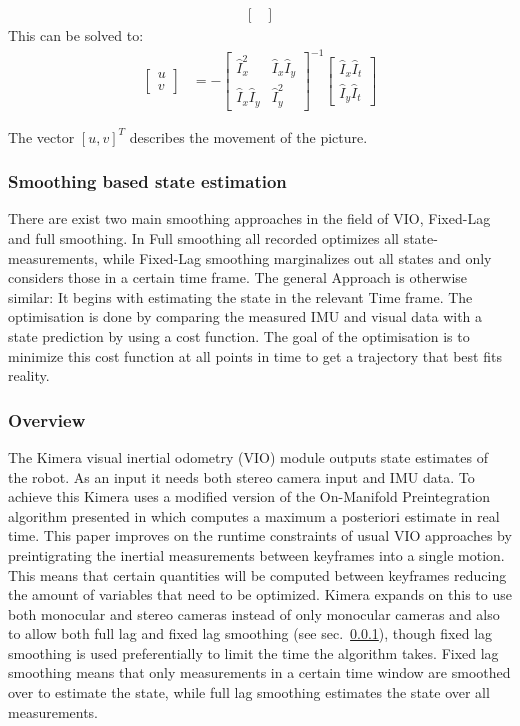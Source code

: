 \documentclass[11pt,a4paper]{article}
\begin{document}
\begin{enumerate}
\begin{align*}
\begin{bmatrix}
           \end{bmatrix}
        \end{align*}
        This can be solved to: 
        \begin{align*}
           \begin{bmatrix}
                u \\ v 
           \end{bmatrix}
           &= - 
           \begin{bmatrix}
               \hat I_x^2 & \hat I_x \hat I_y \\  \hat I_x \hat I_y & \hat I_y^2
           \end{bmatrix} ^{-1}
           \begin{bmatrix}
                \hat I_x \hat I_t \\ \hat I_y \hat I_t 
           \end{bmatrix}
        \end{align*}
\end{enumerate}
The vector $[u,v]^T$ describes the movement of the picture.
\subsubsection{Smoothing based state estimation} \label{Pre:Smoothing}
There are exist two main smoothing approaches in the field of VIO, Fixed-Lag and full smoothing.
In Full smoothing all recorded optimizes all state-measurements, while Fixed-Lag smoothing marginalizes out all states and only considers those in a certain time frame.
The general Approach is otherwise similar: It begins with estimating the state in the relevant Time frame.
The optimisation is done by comparing the measured IMU and visual data with a state prediction by using a cost function. 
The goal of the optimisation is to minimize this cost function at all points in time to get a trajectory that best fits reality.
\subsubsection{Overview} \label{Sec:K-VIO overview}
The Kimera visual inertial odometry (VIO) module outputs state estimates of the robot.
As an input it needs both stereo camera input and IMU data. 
To achieve this Kimera uses a modified version of the On-Manifold Preintegration algorithm presented in \cite{Forster_2017} which computes a maximum a posteriori estimate in real time. 
This paper improves on the runtime constraints of usual VIO approaches by preintigrating the inertial measurements between keyframes into a single motion. 
This means that certain quantities will be computed between keyframes reducing the amount of variables that need to be optimized. 
Kimera expands on this to use both monocular and stereo cameras instead of only monocular cameras and also to allow both full lag and fixed lag smoothing (see sec.~\ref{Pre:Smoothing}), though fixed lag smoothing is used preferentially to limit the time the algorithm takes.
Fixed lag smoothing means that only measurements in a certain time window are smoothed over to estimate the state, while full lag smoothing estimates the state over all measurements.
\end{document}
